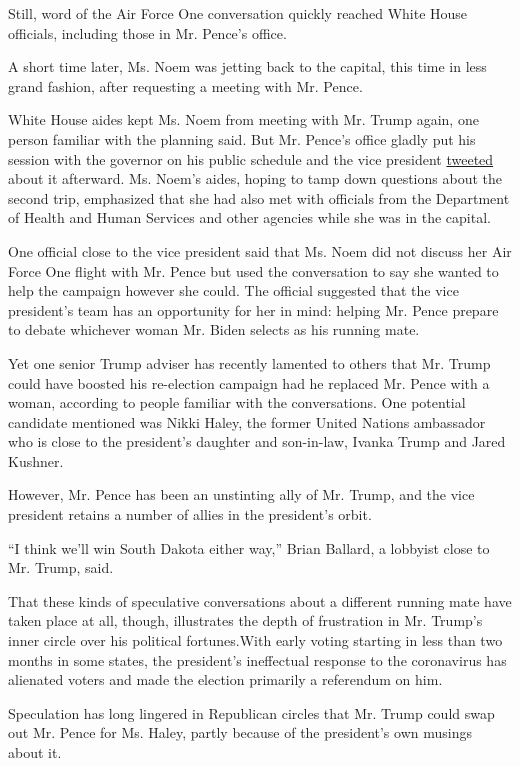 Still, word of the Air Force One conversation quickly reached White
House officials, including those in Mr. Pence's office.

A short time later, Ms. Noem was jetting back to the capital, this time
in less grand fashion, after requesting a meeting with Mr. Pence.

White House aides kept Ms. Noem from meeting with Mr. Trump again, one
person familiar with the planning said. But Mr. Pence's office gladly
put his session with the governor on his public schedule and the vice
president
\href{https://twitter.com/mike_pence/status/1286061448897142784?lang=en}{tweeted}
about it afterward. Ms. Noem's aides, hoping to tamp down questions
about the second trip, emphasized that she had also met with officials
from the Department of Health and Human Services and other agencies
while she was in the capital.

One official close to the vice president said that Ms. Noem did not
discuss her Air Force One flight with Mr. Pence but used the
conversation to say she wanted to help the campaign however she could.
The official suggested that the vice president's team has an opportunity
for her in mind: helping Mr. Pence prepare to debate whichever woman Mr.
Biden selects as his running mate.

Yet one senior Trump adviser has recently lamented to others that Mr.
Trump could have boosted his re-election campaign had he replaced Mr.
Pence with a woman, according to people familiar with the conversations.
One potential candidate mentioned was Nikki Haley, the former United
Nations ambassador who is close to the president's daughter and
son-in-law, Ivanka Trump and Jared Kushner.

However, Mr. Pence has been an unstinting ally of Mr. Trump, and the
vice president retains a number of allies in the president's orbit.

``I think we'll win South Dakota either way,'' Brian Ballard, a lobbyist
close to Mr. Trump, said.

That these kinds of speculative conversations about a different running
mate have taken place at all, though, illustrates the depth of
frustration in Mr. Trump's inner circle over his political fortunes.With
early voting starting in less than two months in some states, the
president's ineffectual response to the coronavirus has alienated voters
and made the election primarily a referendum on him.

Speculation has long lingered in Republican circles that Mr. Trump could
swap out Mr. Pence for Ms. Haley, partly because of the president's own
musings about it.

